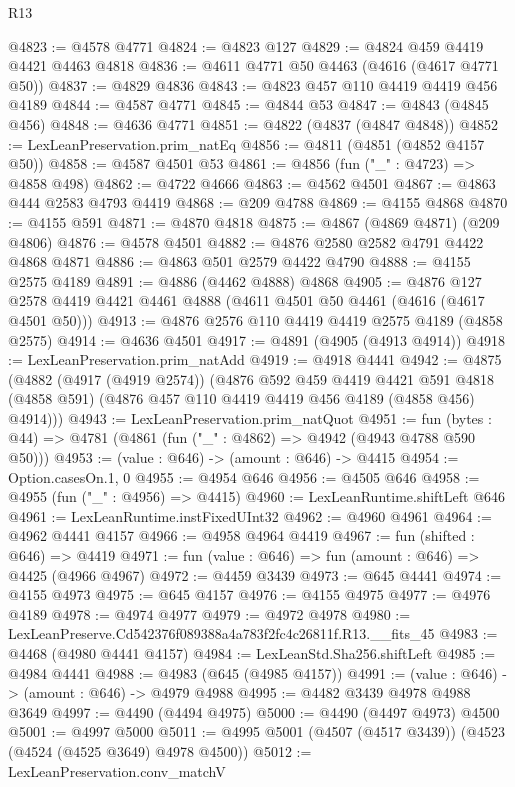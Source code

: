 \begin{lexlean}{R13}
\begin{coremodule}
@4823 := @4578 @4771
@4824 := @4823 @127
@4829 := @4824 @459 @4419 @4421 @4463 @4818
@4836 := @4611 @4771 @50 @4463 (@4616 (@4617 @4771 @50))
@4837 := @4829 @4836
@4843 := @4823 @457 @110 @4419 @4419 @456 @4189
@4844 := @4587 @4771
@4845 := @4844 @53
@4847 := @4843 (@4845 @456)
@4848 := @4636 @4771
@4851 := @4822 (@4837 (@4847 @4848))
@4852 := LexLeanPreservation.prim_natEq
@4856 := @4811 (@4851 (@4852 @4157 @50))
@4858 := @4587 @4501 @53
@4861 := @4856 (fun ("_" : @4723) => @4858 @498)
@4862 := @4722 @4666
@4863 := @4562 @4501
@4867 := @4863 @444 @2583 @4793 @4419
@4868 := @209 @4788
@4869 := @4155 @4868
@4870 := @4155 @591
@4871 := @4870 @4818
@4875 := @4867 (@4869 @4871) (@209 @4806)
@4876 := @4578 @4501
@4882 := @4876 @2580 @2582 @4791 @4422 @4868 @4871
@4886 := @4863 @501 @2579 @4422 @4790
@4888 := @4155 @2575 @4189
@4891 := @4886 (@4462 @4888) @4868
@4905 := @4876 @127 @2578 @4419 @4421 @4461 @4888 (@4611 @4501 @50 @4461 (@4616 (@4617 @4501 @50)))
@4913 := @4876 @2576 @110 @4419 @4419 @2575 @4189 (@4858 @2575)
@4914 := @4636 @4501
@4917 := @4891 (@4905 (@4913 @4914))
@4918 := LexLeanPreservation.prim_natAdd
@4919 := @4918 @4441
@4942 := @4875
    (@4882
      (@4917 (@4919 @2574))
      (@4876
        @592
        @459
        @4419
        @4421
        @591
        @4818
        (@4858 @591)
        (@4876 @457 @110 @4419 @4419 @456 @4189 (@4858 @456) @4914)))
@4943 := LexLeanPreservation.prim_natQuot
@4951 := fun (bytes : @44) => @4781 (@4861 (fun ("_" : @4862) => @4942 (@4943 @4788 @590 @50)))
@4953 := (value : @646) -> (amount : @646) -> @4415
@4954 := Option.casesOn.{1, 0}
@4955 := @4954 @646
@4956 := @4505 @646
@4958 := @4955 (fun ("_" : @4956) => @4415)
@4960 := LexLeanRuntime.shiftLeft @646
@4961 := LexLeanRuntime.instFixedUInt32
@4962 := @4960 @4961
@4964 := @4962 @4441 @4157
@4966 := @4958 @4964 @4419
@4967 := fun (shifted : @646) => @4419
@4971 := fun (value : @646) => fun (amount : @646) => @4425 (@4966 @4967)
@4972 := @4459 @3439
@4973 := @645 @4441
@4974 := @4155 @4973
@4975 := @645 @4157
@4976 := @4155 @4975
@4977 := @4976 @4189
@4978 := @4974 @4977
@4979 := @4972 @4978
@4980 := LexLeanPreserve.Cd542376f089388a4a783f2fc4c26811f.R13.__fits_45
@4983 := @4468 (@4980 @4441 @4157)
@4984 := LexLeanStd.Sha256.shiftLeft
@4985 := @4984 @4441
@4988 := @4983 (@645 (@4985 @4157))
@4991 := (value : @646) -> (amount : @646) -> @4979 @4988
@4995 := @4482 @3439 @4978 @4988 @3649
@4997 := @4490 (@4494 @4975)
@5000 := @4490 (@4497 @4973) @4500
@5001 := @4997 @5000
@5011 := @4995 @5001 (@4507 (@4517 @3439)) (@4523 (@4524 (@4525 @3649) @4978 @4500))
@5012 := LexLeanPreservation.conv_matchV

\end{coremodule}
\end{lexlean}
